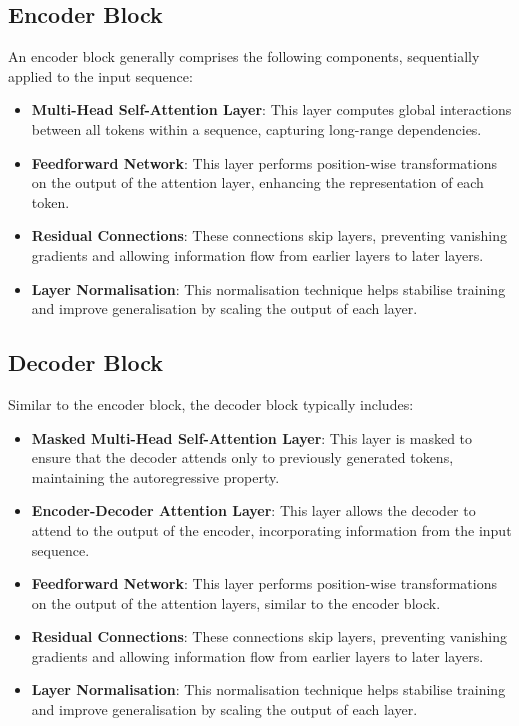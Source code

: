 \documentclass[12pt,a4paper]{report}
\begin{document}
\subsection{Encoder Block}
An encoder block generally comprises the following components, sequentially applied to the input sequence:
\begin{itemize}
    \item \textbf{Multi-Head Self-Attention Layer}: This layer computes global interactions between all tokens within a sequence, capturing long-range dependencies.
    \item \textbf{Feedforward Network}: This layer performs position-wise transformations on the output of the attention layer, enhancing the representation of each token.
    \item \textbf{Residual Connections}: These connections skip layers, preventing vanishing gradients and allowing information flow from earlier layers to later layers.
    \item \textbf{Layer Normalisation}: This normalisation technique helps stabilise training and improve generalisation by scaling the output of each layer.
\end{itemize}

\subsection{Decoder Block}
Similar to the encoder block, the decoder block typically includes:
\begin{itemize}
    \item \textbf{Masked Multi-Head Self-Attention Layer}: This layer is masked to ensure that the decoder attends only to previously generated tokens, maintaining the autoregressive property.
    \item \textbf{Encoder-Decoder Attention Layer}: This layer allows the decoder to attend to the output of the encoder, incorporating information from the input sequence.
    \item \textbf{Feedforward Network}: This layer performs position-wise transformations on the output of the attention layers, similar to the encoder block.
    \item \textbf{Residual Connections}: These connections skip layers, preventing vanishing gradients and allowing information flow from earlier layers to later layers.
    \item \textbf{Layer Normalisation}: This normalisation technique helps stabilise training and improve generalisation by scaling the output of each layer.
\end{itemize}
\end{document}
